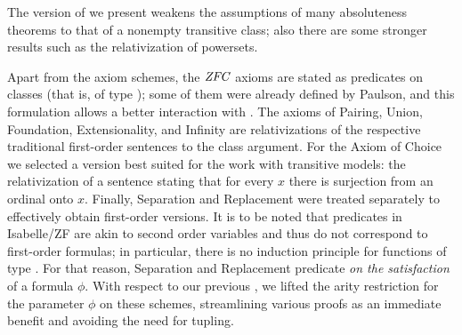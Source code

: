The version of  we present weakens the
assumptions of many absoluteness theorems to that
of a nonempty transitive class; also there are some stronger results
such as the relativization of powersets.

Apart from the axiom schemes, the $\mathit{ZFC}$ 
axioms are stated as predicates on classes (that is,
of type ); some
of them were already defined by Paulson, and this formulation allows a
better interaction with . 
The axioms of Pairing, Union, Foundation,
Extensionality, and Infinity are relativizations of the respective
traditional 
first-order sentences to the class argument. For the Axiom of Choice
we selected a version best suited for the work with transitive
models: the relativization of a sentence stating that for every $x$
there is surjection from an ordinal onto $x$. Finally, Separation and
Replacement were treated separately to effectively obtain first-order
versions. It is to be noted that predicates in Isabelle/ZF are akin to
second order variables and thus do not correspond to first-order
formulas; in particular, there is no induction principle for functions
of type . For that reason, Separation and
Replacement predicate \emph{on the satisfaction} of a formula $\phi$.
With respect to our previous \cite{2019arXiv190103313G}, we lifted the
arity restriction for the parameter $\phi$ on these schemes,
streamlining various proofs as an immediate benefit and avoiding the
need for tupling.


